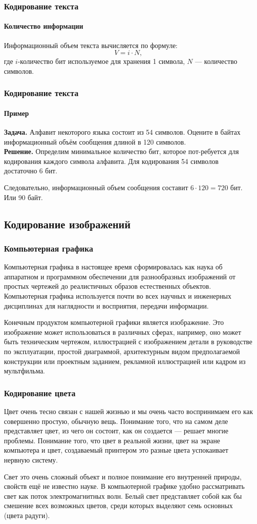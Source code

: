 \begin{frame}
\frametitle{Кодирование текста}
\framesubtitle{Количество информации}

Информационный объем текста вычисляется по формуле:
$$ V=i\cdot N,$$
где $i$-количество бит используемое для хранения 1 символа, $N$ --- количество символов.
\end{frame}

\begin{frame}
\frametitle{Кодирование текста}
\framesubtitle{Пример}

\textbf{Задача.} Алфавит некоторого языка состоит из 54 символов. Оцените в байтах информационный объём сообщения длиной в 120 символов. \\\pause
\textbf{Решение.} Определим минимальное количество бит, которое  пот-ребуется для кодирования каждого символа алфавита.
Для кодирования 54 символов достаточно 6 бит.

Следовательно, информационный объем  сообщения составит  $6\cdot 120 = 720$  бит.  Или  90  байт.

\end{frame}
\subsection{Кодирование изображений}
\begin{frame}
\frametitle{Компьютерная графика}
Компьютерная графика в настоящее время сформировалась как наука об аппаратном и программном обеспечении для разнообразных изображений от простых чертежей до реалистичных образов естественных объектов. Компьютерная графика используется почти во всех научных и инженерных дисциплинах для наглядности и восприятия, передачи информации. 

Конечным продуктом компьютерной графики является изображение. Это изображение может использоваться в различных сферах, например, оно может быть техническим чертежом, иллюстрацией с изображением детали в руководстве по эксплуатации, простой диаграммой, архитектурным видом предполагаемой конструкции или проектным заданием, рекламной иллюстрацией или кадром из мультфильма.

\end{frame}
\begin{frame}
\frametitle{Кодирование цвета}


Цвет очень тесно связан с нашей жизнью и мы очень часто воспринимаем его как совершенно простую, обычную вещь. Понимание того, что на самом деле представляет цвет, из чего он состоит, как он создается --- решает многие проблемы. Понимание того, что цвет в реальной жизни, цвет на экране компьютера и цвет, создаваемый принтером это разные цвета успокаивает нервную систему.

Свет это очень сложный объект и полное понимание его внутренней природы, свойств ещё не известно науке. В компьютерной графике удобно рассматривать свет как поток электромагнитных волн. Белый свет представляет собой как бы смешение всех возможных цветов, среди которых выделяют семь основных (цвета радуги).
\end{frame}

